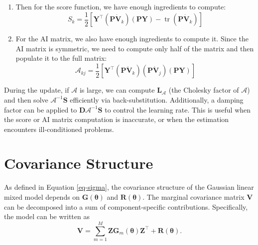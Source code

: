 \documentclass[
  letterpaper,
  DIV=11,
  numbers=noendperiod]{scrartcl}
\begin{document}
\begin{enumerate}
\begin{equation}
  \end{equation} To compute Equation \eqref{eq:P_Sigma_expanded}, we
  need to compute: \begin{align}
  &\text{a. } \symbf{V}^{-1} \dot{\symbf{V}}_k \nonumber \\
  &\text{b. } \symbf{V}^{-1} \symbf{X} (\symbf{X}^\top \symbf{V}^{-1} \symbf{X})^{-1} \symbf{X}^\top \symbf{V}^{-1} \dot{\symbf{V}}_k \nonumber
  \end{align}
\item
  Then for the score function, we have enough ingredients to compute:
  \begin{equation}
  S_k = \frac{1}{2}\left[\symbf{Y}^\top (\symbf{P} \dot{\symbf{V}}_k) (\symbf{P}\symbf{Y}) - \operatorname{tr}(\symbf{P} \dot{\symbf{V}}_k)\right]
  \label{eq:score_computed}
  \end{equation}
\item
  For the AI matrix, we also have enough ingredients to compute it.
  Since the AI matrix is symmetric, we need to compute only half of the
  matrix and then populate it to the full matrix: \begin{equation}
  \mathcal{A}_{kj} = \frac{1}{2}\left[\symbf{Y}^\top (\symbf{P} \dot{\symbf{V}}_k) (\symbf{P} \dot{\symbf{V}}_j) (\symbf{P}\symbf{Y})\right]
  \label{eq:AI_computed}
  \end{equation}
\end{enumerate}

During the update, if \(\mathcal{A}\) is large, we can compute
\(\symbf{L}_{\mathcal{A}}\) (the Cholesky factor of \(\mathcal{A}\)) and
then solve \(\mathcal{A}^{-1} \symbf{S}\) efficiently via
back-substitution. Additionally, a damping factor can be applied to
\(\symbf{D} \mathcal{A}^{-1} \symbf{S}\) to control the learning rate.
This is useful when the score or AI matrix computation is inaccurate, or
when the estimation encounters ill-conditioned problems.

\section{Covariance Structure}\label{covariance-structure}

As defined in Equation \eqref{eq-sigma}, the covariance structure of the
Gaussian linear mixed model depends on \(\symbf{G}(\symbf{\theta})\) and
\(\symbf{R}(\symbf{\theta})\). The marginal covariance matrix
\(\symbf{V}\) can be decomposed into a sum of component-specific
contributions. Specifically, the model can be written as
\begin{equation}
\symbf{V} = \sum_{m=1}^{M} \symbf{Z}\symbf{G}_m(\symbf{\theta})\symbf{Z}^\top + \symbf{R}(\symbf{\theta}).
\end{equation}
\end{document}
